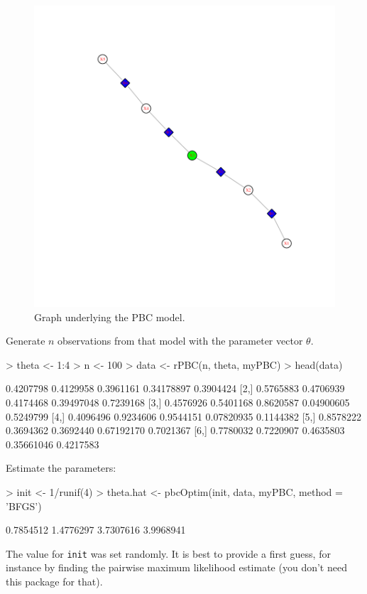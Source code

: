 \documentclass[a4paper]{article}
\begin{document}
\begin{figure}[htbp]
  \begin{center}
\includegraphics{PBC-005}
     \caption{Graph underlying the PBC model.}
     \label{graph}
  \end{center}
\end{figure}
Generate $n$ observations from that model with the parameter vector $\theta$.
\begin{Schunk}
\begin{Sinput}
> theta <- 1:4
> n <- 100
> data <- rPBC(n, theta, myPBC)
> head(data)
\end{Sinput}
\begin{Soutput}
          [,1]      [,2]      [,3]       [,4]      [,5]
[1,] 0.4207798 0.4129958 0.3961161 0.34178897 0.3904424
[2,] 0.5765883 0.4706939 0.4174468 0.39497048 0.7239168
[3,] 0.4576926 0.5401168 0.8620587 0.04900605 0.5249799
[4,] 0.4096496 0.9234606 0.9544151 0.07820935 0.1144382
[5,] 0.8578222 0.3694362 0.3692440 0.67192170 0.7021367
[6,] 0.7780032 0.7220907 0.4635803 0.35661046 0.4217583
\end{Soutput}
\end{Schunk}
Estimate the parameters:
\begin{Schunk}
\begin{Sinput}
> init <- 1/runif(4)
> theta.hat <- pbcOptim(init, data, myPBC, method = 'BFGS')
\end{Sinput}
\end{Schunk}
\begin{Schunk}
\begin{Soutput}
[1] 0.7854512 1.4776297 3.7307616 3.9968941
\end{Soutput}
\end{Schunk}
The value for \verb?init? was set randomly. It is best to provide a first guess, for instance by finding the pairwise maximum likelihood estimate (you don't need this package for that).
\end{document}
